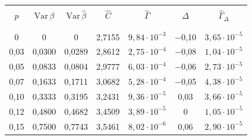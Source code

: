 \begin{table}[b]\small %


\vspace*{-12pt}


\begin{center}




\vspace*{2ex}





\begin{tabular}{|c|c|c|c|c|c|c|}


\hline


&&&&&&\\[-9pt]


$p$& $\mathrm{Var} \,\beta$ &  $\mathrm{Var} \,\hat{\beta}$  & $\hat{C}$ & $\hat\Gamma$ & $\Delta$ 


&${\hat\Gamma}_{\Delta}$  \\ 


&&&&&&\\[-9pt] 


\hline


&&&&&&\\[-9pt]


0& 0 &  0 & 2,7155 & $9{,}84\cdot 10^{-3} $& $-$0,10 & $3{,}65 \cdot 10^{-5}$  \\




 0,03& 0,0300 & 0,0289  &2,8612  & $2{,}75 \cdot 10^{-4} $&$-$0,08&  $1{,}04 \cdot 10^{-5} $\\




0,05& 0,0833 & 0,0804 & 2,9777 &$6{,}03 \cdot 10^{-4}$ & $-$0,06 & $2{,}73\cdot 10^{-5}$\\




0,07& 0,1633 & 0,1711 &3,0682  &$ 5{,}28 \cdot 10^{-4}$ & $-$0,05 & $4{,}38 \cdot 10^{-5}$  \\




0,10& 0,3333 & 0,3195 &3,2431 &$ 9{,}36 \cdot 10^{-5}$ & \hphantom{$-$}0,03 & $3{,}66 \cdot 10^{-5}$  \\




0,12& 0,4800 & 0,4682 & 3,4509 &$ 3{,}89 \cdot 10^{-5}$ &  0\hphantom{0} & $1{,}05 \cdot 10^{-5}$ \\




0,15& 0,7500 & 0,7743 &3,5461  &$ 8{,}02 \cdot 10^{-6}$ &  \hphantom{$-$}0,06 & $2{,}90 \cdot 10^{-5}$  \\


\hline


\end{tabular}


\end{center}


\end{table}








